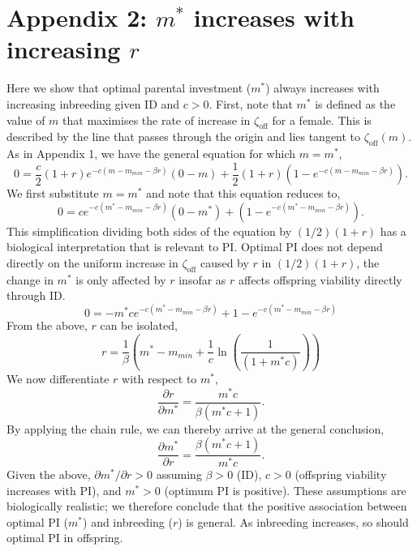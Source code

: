 \documentclass[12pt]{article}
\begin{document}
\section*{Appendix 2: $m^{*}$ increases with increasing $r$}

Here we show that optimal parental investment ($m^{*}$) always increases with increasing inbreeding given ID and $c>0$. First, note that $m^{*}$ is defined as the value of $m$ that maximises the rate of increase in $\zeta_{\textrm{off}}$ for a female. This is described by the line that passes through the origin and lies tangent to $\zeta_{\textrm{off}}(m)$. As in Appendix 1, we have the general equation for which $m=m^{*}$,
\begin{equation}
0 = \frac{c}{2} \left(1+r\right)e^{-c\left(m-m_{min}-\beta r\right)}\left(0-m\right) + \frac{1}{2}\left(1+r\right)\left(1-e^{-c\left(m-m_{min}-\beta r\right)}\right).
\end{equation}
We first substitute $m=m^{*}$ and note that this equation reduces to,
\begin{equation}
0 = c e^{-c\left(m^{*}-m_{min}-\beta r\right)}\left(0-m^{*}\right) + \left(1-e^{-c\left(m^{*}-m_{min}-\beta r\right)}\right). 
\end{equation}
This simplification dividing both sides of the equation by $(1/2)(1+r)$ has a biological interpretation that is relevant to PI. Optimal PI does not depend directly on the uniform increase in $\zeta_{\textrm{off}}$ caused by $r$ in $(1/2)(1+r)$, the change in $m^{*}$ is only affected by $r$ insofar as $r$ affects offspring viability directly through ID. 
\begin{equation}
0 = -m^{*} c e^{-c\left(m^{*}-m_{min}-\beta r\right)} + 1-e^{-c\left(m^{*}-m_{min}-\beta r\right)}
\end{equation}
From the above, $r$ can be isolated,
\begin{equation}
r = \frac{1}{\beta}\left(m^{*} - m_{min} + \frac{1}{c}\ln\left(\frac{1}{\left(1 + m^{*} c\right)}\right)\right)
\end{equation}
We now differentiate $r$ with respect to $m^{*}$,
\begin{equation}
\frac{\partial r}{\partial m^{*}} = \frac{m^{*} c}{\beta \left(m^{*} c + 1\right)}. 
\end{equation}
By applying the chain rule, we can thereby arrive at the general conclusion,
\begin{equation}
\frac{\partial m^{*}}{\partial r} = \frac{\beta \left(m^{*} c + 1\right)}{m^{*} c}. 
\end{equation} 
Given the above, $\partial m^{*} / \partial r > 0$ assuming $\beta>0$ (ID), $c>0$ (offspring viability increases with PI), and $m^{*}>0$ (optimum PI is positive). These assumptions are biologically realistic; we therefore conclude that the positive association between optimal PI ($m^{*}$) and inbreeding ($r$) is general. As inbreeding increases, so should optimal PI in offspring.
\end{document}
